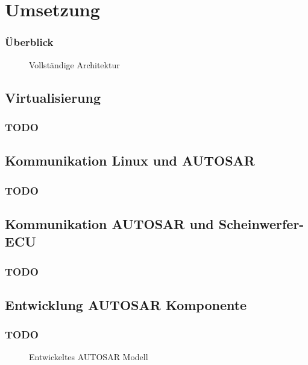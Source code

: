 \documentclass[draft]{beamer}
\newcommand{\inputImage}[1]{}
\begin{document}
\section{Umsetzung}
\label{sec:umsetzung}

\begin{frame}
\frametitle{Überblick}
    \begin{figure}[ht]
        \centering
        \inputImage{arch_finished.dia}
        \caption{Vollständige Architektur}
        \label{fig:arch_finished}
    \end{figure}
\end{frame}

\subsection{Virtualisierung}
\begin{frame}
\frametitle{TODO}

\end{frame}

\subsection{Kommunikation Linux und AUTOSAR}
\begin{frame}
\frametitle{TODO}

\end{frame}

\subsection{Kommunikation AUTOSAR und Scheinwerfer-ECU}
\begin{frame}
\frametitle{TODO}
\end{frame}

\subsection{Entwicklung AUTOSAR Komponente}
\begin{frame}
\frametitle{TODO}
    \begin{figure}[ht]
        \centering
        \resizebox{\linewidth}{!}{\inputImage{SMLS_Modell.dia}}
        \caption{Entwickeltes AUTOSAR Modell}
        \label{fig:smls_modell}
    \end{figure}
\end{frame}
\end{document}
